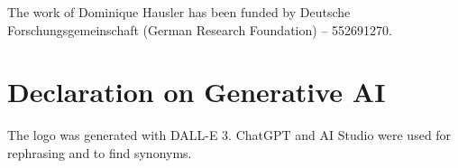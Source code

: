 \documentclass{llncs}
\begin{document}
\subsubsection{\ackname}
The work of Dominique Hausler has been funded by Deutsche Forschungsgemeinschaft (German Research Foundation) -- 552691270.


\section*{Declaration on Generative AI}
The logo was generated with DALL-E 3. ChatGPT and AI Studio were used for rephrasing and to find synonyms.



\end{document}
